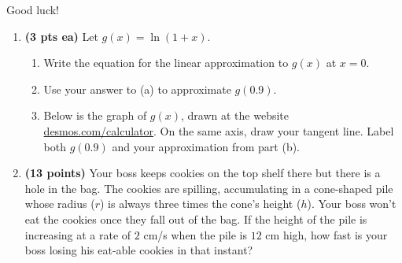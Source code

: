\documentclass[12pt,letterpaper]{article}
\begin{document}
\begin{flushright}\Large Good luck!\end{flushright}

\newpage

\begin{enumerate}[1.]

\item {\bf (3 pts ea)} Let $g(x)=\ln{(1+x)}$.
	\begin{enumerate}
	\item Write the equation for the linear approximation to $g(x)$ at $x=0$.
	
	\vspace{12pc}
	\item Use your answer to (a) to approximate $g(0.9)$.

	\vspace{6pc}
	\item Below is the graph of $g(x)$, drawn at the website \url{desmos.com/calculator}. On the same axis, draw your tangent line.  Label both $g(0.9)$ and your approximation from part (b).
	
	\vspace{2pc}
	\end{enumerate}
	
\newpage
\item {\bf (13 points)} Your boss keeps cookies on the top shelf there but there is a hole in the bag.  The cookies are spilling, accumulating in a cone-shaped pile whose radius ($r$) is always three times the cone's height ($h$).  Your boss won't eat the cookies once they fall out of the bag.  If the height of the pile is increasing at a rate of $2$ cm/s when the pile is $12$ cm high, how fast is your boss losing his eat-able cookies in that instant?  


\end{enumerate}
\end{document}
